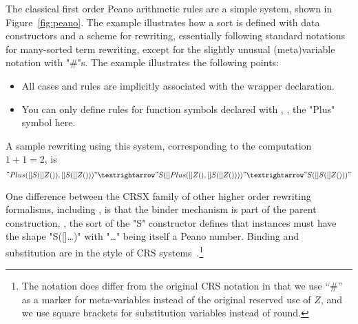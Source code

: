 \documentclass[letterpaper,11pt]{article}
\begin{document}
\begin{example}[Peano]\label{ex:peano}
  The classical first order Peano arithmetic rules are a simple \hax system, shown in
  Figure~\ref{fig:peano}.  The example illustrates how a sort is defined with data constructors and
  a scheme for rewriting, essentially following standard notations for many-sorted term rewriting,
  except for the slightly unusual (meta)variable notation with "#"s. The example illustrates the
  following points:
  \begin{itemize}

  \item All cases and rules are implicitly associated with the wrapper  declaration.

  \item You can only define rules for function symbols declared with , \ie, the "Plus"
    symbol here.

  \end{itemize}
  A sample rewriting using this system, corresponding to the computation $1+1=2$, is
  \begin{displaymath}
    "Plus([]S([]Z()), []S([]Z()))" →
    "S([]Plus([]Z(), []S([]Z())))" →
    "S([]S([]Z()))"
  \end{displaymath}
\end{example}

\begin{remark}
  One difference between the CRSX family of other higher order rewriting formalisms, including \hax,
  is that the binder mechanism is part of the parent construction, \eg, the sort of the "S"
  constructor defines that instances must have the shape "S([]…)" with "…" being itself a Peano
  number.  Binding and substitution are in the style of CRS
  systems~\cite{Klop+:tcs1993}.\footnote{The notation does differ from the original CRS notation in
    that we use ``\#'' as a marker for meta-variables instead of the original reserved use of $Z$, and
    we use square brackets for substitution variables instead of round.}
\end{remark}
\end{document}
